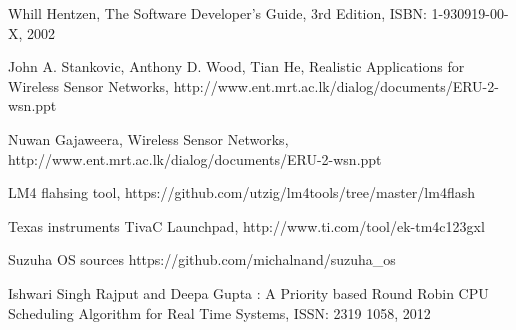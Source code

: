 \documentclass[a4paper, conference]{IEEEtran}
\begin{document}
 
\begin{thebibliography}{99}

 Whill Hentzen, The Software Developer's Guide, 3rd Edition, ISBN: 1-930919-00-X, 2002


 John A. Stankovic, Anthony D. Wood, Tian He, Realistic Applications for Wireless Sensor Networks, http://www.ent.mrt.ac.lk/dialog/documents/ERU-2-wsn.ppt

 Nuwan Gajaweera, Wireless Sensor Networks, http://www.ent.mrt.ac.lk/dialog/documents/ERU-2-wsn.ppt

 LM4 flahsing tool, https://github.com/utzig/lm4tools/tree/master/lm4flash

 Texas instruments TivaC Launchpad, http://www.ti.com/tool/ek-tm4c123gxl

Suzuha OS sources https://github.com/michalnand/suzuha\_os

 Ishwari Singh Rajput and Deepa Gupta : A Priority based Round Robin CPU Scheduling Algorithm for Real Time Systems, ISSN: 2319 1058, 2012


\end{thebibliography}
\end{document}
